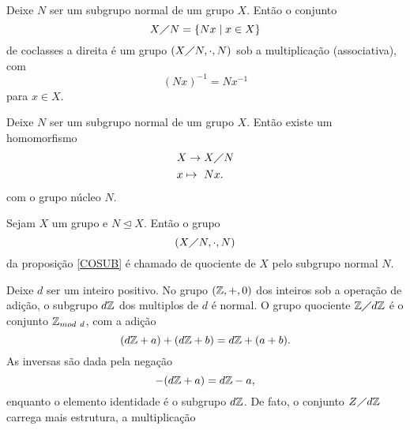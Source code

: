 \begin{stat}\label{COSUB}
  Deixe $N$ ser um subgrupo normal de um grupo $X$. Então o conjunto
  $$X \diagup N = \{Nx \mid x \in X\}$$ de coclasses a direita é um grupo $(X\diagup N, \cdot , N)$ sob a multiplicação (associativa), com $$(Nx)^{-1} = Nx^{-1}$$ para $x\in X$.
\end{stat}
\begin{corollary}\label{CORO1}
  Deixe $N$ ser um subgrupo normal de um grupo $X$. Então existe um homomorfismo
  \begin{alignat}{2}
    &X \to X\diagup N \nonumber\\
    &x \mapsto\ Nx.
    \nonumber
  \end{alignat}
  com o grupo núcleo $N$.
\end{corollary}
\begin{definition}
  Sejam $X$ um grupo e $N \trianglelefteq X$. Então o grupo $$(X\diagup N, \cdot , N)$$ da proposição \ref{COSUB} é chamado de quociente de $X$ pelo subgrupo normal $N$.
\end{definition}
\begin{exmp}
  Deixe $d$ ser um inteiro positivo. No grupo $(\mathbb{Z}, +, 0)$ dos inteiros sob a operação de adição, o subgrupo $d\mathbb{Z}$ dos multiplos de $d$ é normal. O grupo quociente $\mathbb{Z} \diagup d\mathbb{Z}$ é o conjunto $\mathbb{Z}_{mod\ d}$, com a adição
  $$(d\mathbb{Z} + a) + (d\mathbb{Z} + b) = d\mathbb{Z} + (a + b).$$ As inversas são dada pela negação $$-(d\mathbb{Z} + a) = d\mathbb{Z} - a,$$ enquanto o elemento identidade é o subgrupo $d\mathbb{Z}$.
  De fato, o conjunto $Z\diagup d\mathbb{Z}$ carrega mais estrutura, a multiplicação
\end{exmp}

